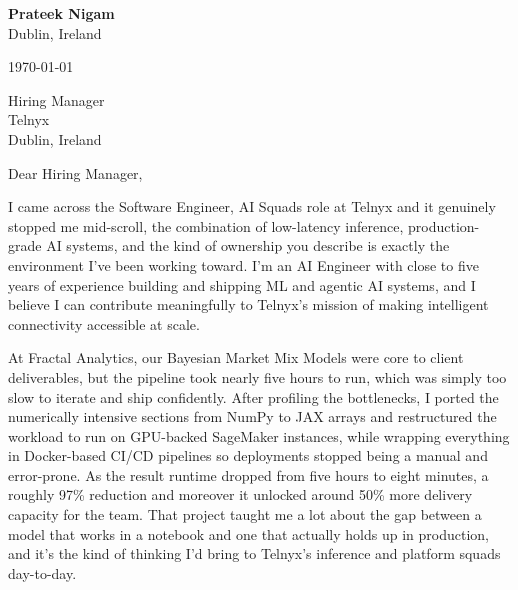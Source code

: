 \documentclass[10.5pt, a4paper]{article}
\begin{document}
\pagestyle{empty}

\begin{flushleft}
    {\large \textbf{Prateek Nigam}} \\
    Dublin, Ireland \\
\end{flushleft}

\vspace{0.3em}
\today

\vspace{0.8em}
Hiring Manager \\
Telnyx \\
Dublin, Ireland

\vspace{0.8em}

Dear Hiring Manager,

I came across the Software Engineer, AI Squads role at Telnyx and it genuinely stopped me mid-scroll, the combination of low-latency inference, production-grade AI systems, and the kind of ownership you describe is exactly the environment I've been working toward. I'm an AI Engineer with close to five years of experience building and shipping ML and agentic AI systems, and I believe I can contribute meaningfully to Telnyx's mission of making intelligent connectivity accessible at scale.

At Fractal Analytics, our Bayesian Market Mix Models were core to client deliverables, but the pipeline took nearly five hours to run, which was simply too slow to iterate and ship confidently. After profiling the bottlenecks, I ported the numerically intensive sections from NumPy to JAX arrays and restructured the workload to run on GPU-backed SageMaker instances, while wrapping everything in Docker-based CI/CD pipelines so deployments stopped being a manual and error-prone. As the result runtime dropped from five hours to eight minutes, a roughly 97\% reduction and moreover it unlocked around 50\% more delivery capacity for the team. That project taught me a lot about the gap between a model that works in a notebook and one that actually holds up in production, and it's the kind of thinking I'd bring to Telnyx's inference and platform squads day-to-day.
\end{document}
